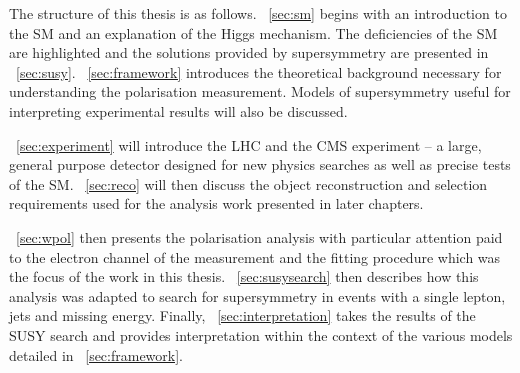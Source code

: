 The structure of this thesis is as follows. \chap~\ref{sec:sm} begins with an
introduction to the \ac{SM} and an explanation of the Higgs mechanism. The
deficiencies of the \ac{SM} are highlighted and the solutions provided by
supersymmetry are presented in
\chap~\ref{sec:susy}. \chap~\ref{sec:framework} introduces the theoretical
background necessary for understanding the \PW polarisation measurement. Models
of supersymmetry useful for interpreting experimental results will also be
discussed.

\chap~\ref{sec:experiment} will introduce the \ac{LHC} and the \ac{CMS}
experiment -- a large, general purpose detector designed for new physics searches
as well as precise tests of the \ac{SM}. \chap~\ref{sec:reco} will then
discuss the object reconstruction and selection requirements used for the
analysis work presented in later chapters.

\chap~\ref{sec:wpol} then presents the \PW polarisation analysis with
particular attention paid to the electron channel of the measurement and the
fitting procedure which was the focus of the work in this
thesis. \chap~\ref{sec:susysearch} then describes how this analysis was
adapted to search for supersymmetry in events with a single lepton, jets and
missing energy. Finally, \chap~\ref{sec:interpretation} takes the results of
the \ac{SUSY} search and provides interpretation within the context of the
various models detailed in \chap~\ref{sec:framework}.
